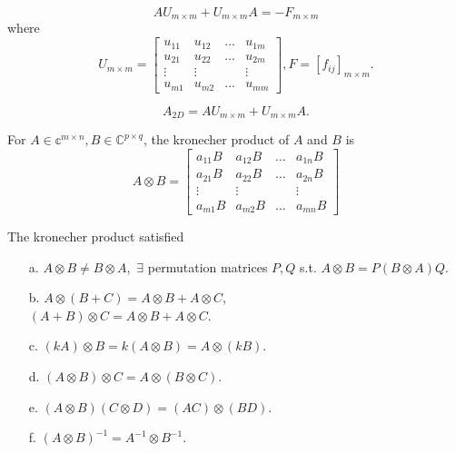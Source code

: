 \begin{prop}
  \begin{equation}
    \label{eq:possionMatrix2D}
    AU_{m\times m}+U_{m\times m}A =  -F_{m\times m}
  \end{equation}
  where
  \begin{displaymath}
    U_{m\times m}=
    \begin{bmatrix}
      u_{11} & u_{12}& \ldots &u_{1m}\\
      u_{21} & u_{22} & \ldots & u_{2m} \\
      \vdots & \vdots &  & \vdots\\
      u_{m1} & u_{m2} & \ldots & u_{mm}
    \end{bmatrix},
    F=[f_{ij}]_{m\times m}.
  \end{displaymath}
\end{prop}

\begin{ntn}
  \begin{equation}
    \label{eq:A_2D}
    A_{2D}=AU_{m\times m}+U_{m\times m}A.
  \end{equation}
\end{ntn}

\begin{defn}
  For $A\in \mathbb{c}^{m\times n}, B\in \mathbb{C}^{p\times q}$,
  the kronecher product of $A$ and $B$ is
  \begin{equation}
    \label{eq:kronecher}
    A\otimes B=
    \begin{bmatrix}
      a_{11}B & a_{12}B &\ldots & a_{1n}B\\
      a_{21}B & a_{22}B & \ldots &a_{2n}B \\
      \vdots & \vdots & &\vdots \\
      a_{m1}B &a_{m2}B &\ldots & a_{mn}B
    \end{bmatrix}
  \end{equation}
\end{defn}

\begin{prop}
  The kronecher product satisfied
  \begin{enumerate}
  \item [a.] $A\otimes B\neq B\otimes A,$
    $\exists$ permutation matrices $P,Q$ s.t.
    $A\otimes B=P(B\otimes A)Q.$
  \item [b.] $A\otimes (B+C)=A\otimes B+ A\otimes C$,\\
    $(A+B)\otimes C=A\otimes B+A\otimes C.$ 
    \item [c.]$(kA)\otimes B=k(A\otimes B)=A\otimes (kB).$
    \item [d.]$(A\otimes B)\otimes C=A\otimes (B\otimes C).$
    \item [e.] $(A\otimes B)(C\otimes D)=(AC)\otimes (BD).$
    \item [f.] $(A\otimes B)^{-1}=A^{-1}\otimes B^{-1}.$
  \end{enumerate}
\end{prop}

